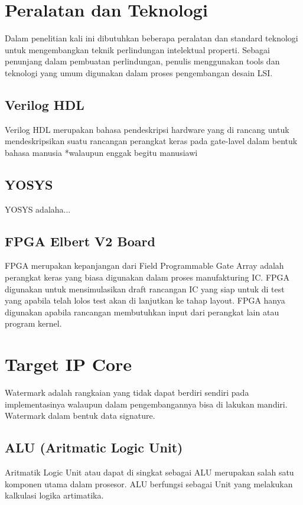 \section{Peralatan dan Teknologi}
Dalam penelitian kali ini dibutuhkan beberapa peralatan dan standard teknologi untuk mengembangkan teknik perlindungan intelektual properti. Sebagai penunjang dalam pembuatan perlindungan, penulis menggunakan tools dan teknologi yang umum digunakan dalam proses pengembangan desain LSI.

\subsection{Verilog HDL}
Verilog HDL merupakan bahasa pendeskripsi hardware yang di rancang untuk mendeskripsikan suatu rancangan perangkat keras pada gate-lavel dalam bentuk bahasa manusia *walaupun enggak begitu manusiawi

\subsection{YOSYS}
YOSYS adalaha...

\subsection{FPGA Elbert V2 Board}
FPGA merupakan kepanjangan dari Field Programmable Gate Array adalah perangkat keras yang biasa digunakan dalam proses manufakturing IC. FPGA digunakan untuk mensimulasikan draft rancangan IC yang siap untuk di test yang apabila telah lolos test akan di lanjutkan ke tahap layout. FPGA hanya digunakan apabila rancangan membutuhkan input dari perangkat lain atau program kernel.

\section{Target IP Core}
Watermark adalah rangkaian yang tidak dapat berdiri sendiri pada implementasinya walaupun dalam pengembangannya bisa di lakukan mandiri. Watermark dalam bentuk data signature.

\subsection{ALU (Aritmatic Logic Unit)}
Aritmatik Logic Unit atau dapat di singkat sebagai ALU merupakan salah satu komponen utama dalam prosesor. ALU berfungsi sebagai Unit yang melakukan kalkulasi logika artimatika.
